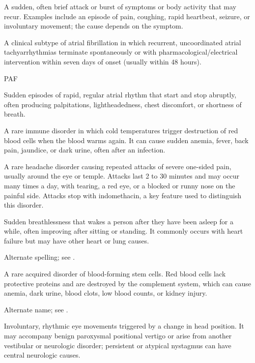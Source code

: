  A sudden, often brief attack or burst of symptoms or body activity that may recur. Examples include an episode of pain, coughing, rapid heartbeat, seizure, or involuntary movement; the cause depends on the symptom.

 A clinical subtype of atrial fibrillation in which recurrent, uncoordinated atrial tachyarrhythmias terminate spontaneously or with pharmacological/electrical intervention within seven days of onset (usually within 48 hours).

\synonyms
PAF

 Sudden episodes of rapid, regular atrial rhythm that start and stop abruptly, often producing palpitations, lightheadedness, chest discomfort, or shortness of breath.

 A rare immune disorder in which cold temperatures trigger destruction of red blood cells when the blood warms again. It can cause sudden anemia, fever, back pain, jaundice, or dark urine, often after an infection.

 A rare headache disorder causing repeated attacks of severe one-sided pain, usually around the eye or temple. Attacks last 2 to 30 minutes and may occur many times a day, with tearing, a red eye, or a blocked or runny nose on the painful side. Attacks stop with indomethacin, a key feature used to distinguish this disorder.

 Sudden breathlessness that wakes a person after they have been asleep for a while, often improving after sitting or standing. It commonly occurs with heart failure but may have other heart or lung causes.

 Alternate spelling; see .

 A rare acquired disorder of blood-forming stem cells. Red blood cells lack protective proteins and are destroyed by the complement system, which can cause anemia, dark urine, blood clots, low blood counts, or kidney injury.

 Alternate name; see .

 Involuntary, rhythmic eye movements triggered by a change in head position. It may accompany benign paroxysmal positional vertigo or arise from another vestibular or neurologic disorder; persistent or atypical nystagmus can have central neurologic causes.

